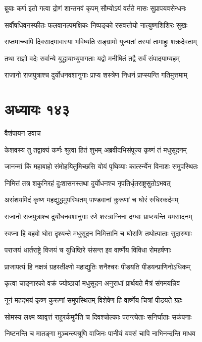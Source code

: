 \twolineshloka
{ब्रूयाः कर्ण इतो गत्वा द्रोणं शान्तनवं कृपम्}
{सौम्योऽयं वर्तते मासः सुप्रापयवसेन्धनः}


\twolineshloka
{सर्वौषधिवनस्फीतः फलवानल्पमक्षिकः}
{निष्पङ्को रसवत्तोयो नात्युष्णशिशिरः सुखः}


\twolineshloka
{सप्तमाच्चापि दिवसादमावास्या भविष्यति}
{सङ्ग्रामो युज्यतां तस्यां तामाहुः शक्रदेवताम्}


\twolineshloka
{तथा राज्ञो वदेः सर्वान्ये युद्धायाभ्युपागताः}
{यद्वो मनीषितं तद्वै सर्वं संपादयाम्यहम्}


\twolineshloka
{राजानो राजपुत्राश्च दुर्योधनवशानुगाः}
{प्राप्य शस्त्रेण निधनं प्राप्स्यन्ति गतिमुत्तमाम्}


\chapter{अध्यायः १४३}
\twolineshloka
{वैशंपायन उवाच}
{}


\twolineshloka
{केशवस्य तु तद्वाक्यं कर्णः श्रुत्वा हितं शुभम्}
{अब्रवीदभिसंपूज्य कृष्णं तं मधुसूदनम्}


\twolineshloka
{जानन्मां किं महाबाहो संमोहयितुमिच्छसि}
{योयं पृथिव्याः कार्त्स्न्येन विनाशः समुपस्थितः}


\twolineshloka
{निमित्तं तत्र शकुनिरहं दुःशासनस्तथा}
{दुर्योधनश्च नृपतिर्धृतराष्ट्रसुतोऽभवत्}


\twolineshloka
{असंशयमिदं कृष्ण महद्युद्धमुपस्थितम्}
{पाण्डवानां कुरूणां च घोरं रुधिरकर्दमम्}


\twolineshloka
{राजानो राजपुत्राश्च दुर्योधनवशानुगाः}
{रणे शस्त्राग्निना दग्धाः प्राप्स्यन्ति यमसादनम्}


\twolineshloka
{स्वप्ना हि बहवो घोरा दृश्यन्ते मधुसूदन}
{निमित्तानि च घोराणि तथोत्पाताः सुदारुणाः}


\twolineshloka
{पराजयं धार्तराष्ट्रे विजयं च युधिष्ठिरे}
{संसन्त इव वार्ष्णेय विविधा रोमहर्षणाः}


\twolineshloka
{प्राजापत्यं हि नक्षत्रं ग्रहस्तीक्ष्णो महाद्युतिः}
{शनैश्चरः पीडयति पीडयन्प्राणिनोऽधिकम्}


\threelineshloka
{कृत्वा चाङ्गारको वक्रं ज्योष्ठायां मधुसूदन}
{अनुराधां प्रार्थयते मैत्रं संगमयन्निव}
{}


\twolineshloka
{नूनं महद्भयं कृष्ण कुरूणां समुपस्थितम्}
{विशेषेण हि वार्ष्णेय चित्रां पीडयते ग्रहः}


\twolineshloka
{सोमस्य लक्ष्म व्यावृत्तं राहुरर्कमुपैति च}
{दिवश्चोल्काः पतन्त्येताः सनिर्घाताः सकंपनाः}


\twolineshloka
{निष्टनन्ति च मातङ्गा मुञ्चन्त्यश्रूणि वाजिनः}
{पानीयं यवसं चापि नाभिनन्दन्ति माधव}


